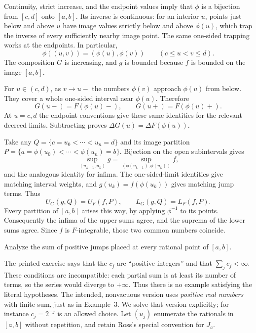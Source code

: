 Continuity, strict increase, and the endpoint values imply that
$\phi$ is a bijection from $[c,d]$ onto $[a,b]$. Its inverse is
continuous: for an interior $u$, points just below and above $u$
have image values strictly below and above $\phi(u)$, which trap
the inverse of every sufficiently nearby image point. The same
one-sided trapping works at the endpoints. In particular,
\[
 \phi((u,v))=(\phi(u),\phi(v))\qquad(c\le u<v\le d).
\]
The composition $G$ is increasing, and $g$ is bounded because
$f$ is bounded on the image $[a,b]$.

For $u\in(c,d)$, as $v\to u-$ the numbers $\phi(v)$ approach
$\phi(u)$ from below. They cover a whole one-sided interval near
$\phi(u)$. Therefore
\[
 G(u-)=F(\phi(u)-),\qquad G(u+)=F(\phi(u)+).
\]
At $u=c,d$ the endpoint conventions give these same identities
for the relevant decreed limits. Subtracting proves
$\Delta G(u)=\Delta F(\phi(u))$.

Take any $Q=\{c=u_0<\cdots<u_n=d\}$ and its image partition
$P=\{a=\phi(u_0)<\cdots<\phi(u_n)=b\}$. Bijection on the open
subintervals gives
\[
 \sup_{(u_{k-1},u_k)}g
 =\sup_{(\phi(u_{k-1}),\phi(u_k))}f,
\]
and the analogous identity for infima. The one-sided-limit
identities give matching interval weights, and $g(u_k)=f(\phi(u_k))$
gives matching jump terms. Thus
\[
 U_G(g,Q)=U_F(f,P),\qquad L_G(g,Q)=L_F(f,P).
\]
Every partition of $[a,b]$ arises this way, by applying $\phi^{-1}$
to its points. Consequently the infima of the upper sums agree,
and the suprema of the lower sums agree. Since $f$ is
$F$-integrable, those two common numbers coincide.

\goal Analyze the sum of positive jumps placed at every rational
point of $[a,b]$.

The printed exercise says that the $c_j$ are ``positive integers''
and that $\sum_jc_j<\infty$. These conditions are incompatible:
each partial sum is at least its number of terms, so the series
would diverge to $+\infty$. Thus there is no example satisfying
the literal hypotheses. The intended, nonvacuous version uses
\emph{positive real numbers} with finite sum, just as in Example~3.
We solve that version explicitly; for instance $c_j=2^{-j}$ is an
allowed choice. Let $(u_j)$ enumerate the rationals in $[a,b]$
without repetition, and retain Ross's special convention for $J_a$.

